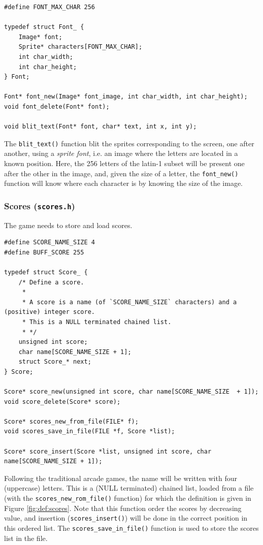 \documentclass[12pt,a4paper]{article}
\newcommand{\cc}[1]{\texttt{#1}}
\begin{document}
\begin{verbatim}
#define FONT_MAX_CHAR 256

typedef struct Font_ {
	Image* font;
	Sprite* characters[FONT_MAX_CHAR];
    int char_width;
    int char_height;
} Font;

Font* font_new(Image* font_image, int char_width, int char_height);
void font_delete(Font* font);

void blit_text(Font* font, char* text, int x, int y);
\end{verbatim}

The \cc{blit_text()} function blit the sprites corresponding to the screen, one after another, using a \textit{sprite font}, i.e. an image where the letters are located in a known position. Here, the 256 letters of the latin-1 subset will be present one after the other in the image, and, given the size of a letter, the \cc{font_new()} function will know where each character is by knowing the size of the image.

\subsubsection{Scores (\texttt{scores.h})}

The game needs to store and load scores.

\begin{verbatim}
#define SCORE_NAME_SIZE 4
#define BUFF_SCORE 255

typedef struct Score_ {
    /* Define a score.
     *
     * A score is a name (of `SCORE_NAME_SIZE` characters) and a (positive) integer score.
     * This is a NULL terminated chained list.
     * */
    unsigned int score;
    char name[SCORE_NAME_SIZE + 1];
    struct Score_* next;
} Score;

Score* score_new(unsigned int score, char name[SCORE_NAME_SIZE  + 1]);
void score_delete(Score* score);

Score* scores_new_from_file(FILE* f);
void scores_save_in_file(FILE *f, Score *list);

Score* score_insert(Score *list, unsigned int score, char name[SCORE_NAME_SIZE + 1]);
\end{verbatim}

Following the traditional arcade games, the name will be written with four (uppercase) letters. This is a (NULL terminated) chained list, loaded from a file (with the \cc{scores_new_rom_file()} function) for which the definition is given in Figure \ref{fig:def:scores}. Note that this function order the scores by decreasing value, and insertion (\cc{scores_insert()}) will be done in the correct position in this ordered list. The \cc{scores_save_in_file()} function is used to store the scores list in the file.
\end{document}
